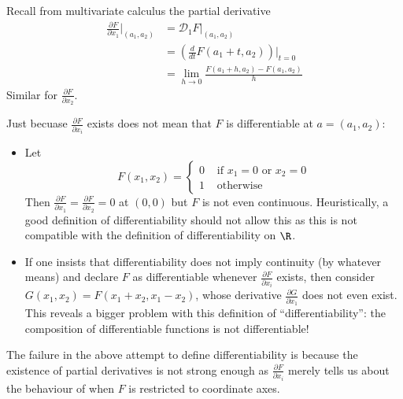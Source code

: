 \documentclass[a4paper]{article}
\newcommand*{\D}{\mathcal{D}}
\theoremstyle{definition}
\begin{document}
Recall from multivariate calculus the partial derivative
\begin{align*}
  \frac{\partial F}{\partial x_1} \Big|_{(a_1, a_2)} &= \D_1 F|_{(a_1, a_2)} \\
                                                     &= \left( \frac{d}{dt} F(a_1 + t, a_2) \right) \Big|_{t = 0} \\
                                                     &= \lim_{h \to 0} \frac{F(a_1 + h, a_2) - F(a_1, a_2)}{h}
\end{align*}
Similar for \(\frac{\partial F}{\partial x_2}\).

\begin{note}
  Just becuase \(\frac{\partial F}{\partial x_i}\) exists does not mean that \(F\) is differentiable at \(a = (a_1, a_2)\):

  \begin{eg}\leavevmode
    \begin{itemize}
    \item Let
      \[
        F(x_1, x_2) =
        \begin{cases}
          0 & \text{ if } x_1 = 0 \text{ or } x_2 = 0 \\
          1 & \text{ otherwise}
        \end{cases}
      \]
      Then \(\frac{\partial F}{\partial x_1} = \frac{\partial F}{\partial x_2} = 0\) at \((0, 0)\) but \(F\) is not even continuous. Heuristically, a good definition of differentiability should not allow this as this is not compatible with the definition of differentiability on \(\R\).
    \item If one insists that differentiability does not imply continuity (by whatever means) and declare \(F\) as differentiable whenever \(\frac{\partial F}{\partial x_i}\) exists, then consider \(G(x_1, x_2) = F(x_1 + x_2, x_1 - x_2)\), whose derivative \(\frac{\partial G}{\partial x_1}\) does not even exist. This reveals a bigger problem with this definition of ``differentiability'': the composition of differentiable functions is not differentiable!
    \end{itemize}
  \end{eg}
\end{note}

The failure in the above attempt to define differentiability is because the existence of partial derivatives is not strong enough as \(\frac{\partial F}{\partial x_i}\) merely tells us about the behaviour of when \(F\) is restricted to coordinate axes.
\end{document}

